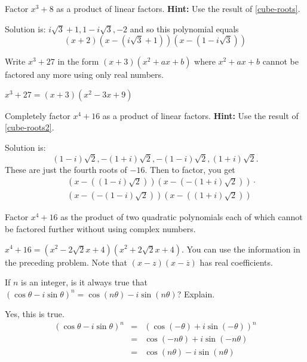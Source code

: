 \begin{enumialphparenastyle}
\begin{ex} Factor $x^{3}+8$ as a product of linear factors. \textbf{Hint:} Use the result of {\eqref{cube-roots}}.
\begin{sol}
Solution
is: $i\sqrt{3}+1,1-i\sqrt{3},-2$ and so this polynomial equals
\[
(x+2) (x-(i\sqrt{3}+1)) (x-(
1-i\sqrt{3}))
\]
\end{sol}
\end{ex}

\begin{ex} Write $x^{3}+27$ in the form $(x+3) (
x^{2}+ax+b) $ where $x^{2}+ax+b$ cannot be factored any more using
only real numbers. 
\begin{sol}
$x^{3}+27= (x+3) (
x^{2}-3x+9) $
\end{sol}
\end{ex}

\begin{ex} Completely factor $x^{4}+16$ as a product of linear factors. \textbf{Hint:} Use the result of {\eqref{cube-roots2}}. 
\begin{sol}
Solution is:
\[
(1-i) \sqrt{2},-(1+i) \sqrt{2},-(1-i)
\sqrt{2},(1+i) \sqrt{2}.
\]
These are just the fourth roots of $-16$. Then to factor, you get
\begin{eqnarray*}
&&(x-((1-i) \sqrt{2})) (x-(
-(1+i) \sqrt{2})) \cdot \\
&&(x-(-(1-i) \sqrt{2})) (x-(
(1+i) \allowbreak \sqrt{2}))
\end{eqnarray*}
\end{sol}
\end{ex}


\begin{ex} Factor $x^{4}+16$ as the product of two quadratic polynomials each of
which cannot be factored further without using complex numbers. 
\begin{sol}
$x^{4}+16=(x^{2}-2\sqrt{2}x+4) (x^{2}+2\sqrt{2}x+4) .
$ You can use the information in the preceding problem. Note that $(
x-z) (x-\overline{z}) $ has real coefficients.
\end{sol}
\end{ex}

\begin{ex} If $n$ is an integer, is it always true that $(\cos \theta
-i\sin \theta) ^{n}=\cos (n\theta) -i\sin (n\theta
)$? Explain.
\begin{sol}
Yes, this is true.
\begin{eqnarray*}
(\cos \theta -i\sin \theta) ^{n} &=&(\cos (-\theta
) +i\sin (-\theta)) ^{n} \\
&=&\cos (-n\theta) +i\sin (-n\theta) \\
&=&\cos (n\theta) -i\sin (n\theta)
\end{eqnarray*}
\end{sol}
\end{ex}



\end{enumialphparenastyle}

